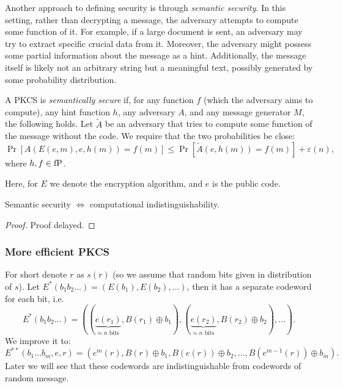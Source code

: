 Another approach to defining security is through \emph{semantic security}.
In this setting, rather than decrypting a message, the adversary attempts to compute some function of it.
For example, if a large document is sent, an adversary may try to extract specific crucial data from it.
Moreover, the adversary might possess some partial information about the message as a hint.
Additionally, the message itself is likely not an arbitrary string but a meaningful text, possibly generated by some probability distribution.

\begin{definition}
	A PKCS is \emph{semantically secure} if, for any function $f$ (which the adversary aims to compute), any hint function $h$, any adversary $A$, and any message generator $M$, the following holds.
	Let $\tilde{A}$ be an adversary that tries to compute some function of the message without the code.
	We require that the two probabilities be close:
	 \[
		 \Pr[A(E(e, m), e, h(m)) = f(m)] \le  \Pr[\tilde{A}(e, h(m)) = f(m)] + \varepsilon(n),
	 \] 
	 where $h, f \in \operatorname{fP}$.
\end{definition}
Here, for $E$ we denote the encryption algorithm, and $e$ is the public code.

\begin{theorem}
	Semantic security $\iff$ computational indistinguishability.
\end{theorem}

\begin{proof}
	Proof delayed.
\end{proof}

\subsubsection{More efficient PKCS}

For short denote $r$ as  $s(r)$ (so we assume that random bits given in distribution of $s$).
Let $E^*(b_1 b_2 \ldots) = (E(b_1), E(b_2), \ldots)$, then it has a separate codeword for each bit, i.e.
\[
	E^*(b_1 b_2 \ldots) = ((\underbrace{e(r_1)}_{\approx n \text{ bits }}, B(r_1) \oplus b_1), (\underbrace{e(r_2)}_{\approx n \text{ bits }}, B(r_2) \oplus b_2), \ldots)
.\] 
We improve it to:
\[
	E^{* *}(b_1 \ldots b_m, e, r) = (e^{m}(r), B(r) \oplus b_1, B(e(r)) \oplus b_2, \ldots, B(e^{m - 1}(r)) \oplus b_m)
.\] 
Later we will see that these codewords are indistinguishable from codewords of random message.
